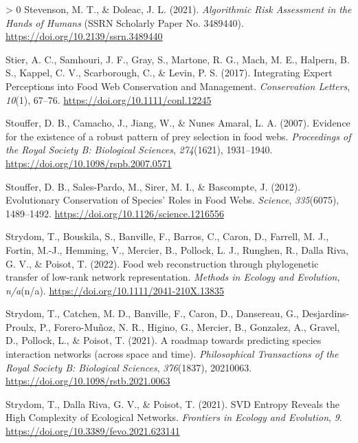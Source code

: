 \documentclass[11pt]{article}
\newlength{\cslhangindent}
\newenvironment{CSLReferences}[3] %
 {%
  \setlength{\parindent}{0pt}
  \ifodd #1 \everypar{\setlength{\hangindent}{\cslhangindent}}\ignorespaces\fi
  \ifnum #2 > 0
  \setlength{\parskip}{#2\baselineskip}
  \fi
 }%
 {}
\begin{document}
\begin{CSLReferences}{1}{0}
\leavevmode\hypertarget{ref-Stevenson2021AlgRis}{}%
Stevenson, M. T., \& Doleac, J. L. (2021). \emph{Algorithmic Risk
Assessment in the Hands of Humans} (SSRN Scholarly Paper No. 3489440).
\url{https://doi.org/10.2139/ssrn.3489440}

\leavevmode\hypertarget{ref-Stier2017IntExp}{}%
Stier, A. C., Samhouri, J. F., Gray, S., Martone, R. G., Mach, M. E.,
Halpern, B. S., Kappel, C. V., Scarborough, C., \& Levin, P. S. (2017).
Integrating Expert Perceptions into Food Web Conservation and
Management. \emph{Conservation Letters}, \emph{10}(1), 67--76.
\url{https://doi.org/10.1111/conl.12245}

\leavevmode\hypertarget{ref-Stouffer2007EviExi}{}%
Stouffer, D. B., Camacho, J., Jiang, W., \& Nunes Amaral, L. A. (2007).
Evidence for the existence of a robust pattern of prey selection in food
webs. \emph{Proceedings of the Royal Society B: Biological Sciences},
\emph{274}(1621), 1931--1940.
\url{https://doi.org/10.1098/rspb.2007.0571}

\leavevmode\hypertarget{ref-Stouffer2012EvoCon}{}%
Stouffer, D. B., Sales-Pardo, M., Sirer, M. I., \& Bascompte, J. (2012).
Evolutionary Conservation of Species' Roles in Food Webs.
\emph{Science}, \emph{335}(6075), 1489--1492.
\url{https://doi.org/10.1126/science.1216556}

\leavevmode\hypertarget{ref-Strydom2022FooWeb}{}%
Strydom, T., Bouskila, S., Banville, F., Barros, C., Caron, D., Farrell,
M. J., Fortin, M.-J., Hemming, V., Mercier, B., Pollock, L. J., Runghen,
R., Dalla Riva, G. V., \& Poisot, T. (2022). Food web reconstruction
through phylogenetic transfer of low-rank network representation.
\emph{Methods in Ecology and Evolution}, \emph{n/a}(n/a).
\url{https://doi.org/10.1111/2041-210X.13835}

\leavevmode\hypertarget{ref-Strydom2021RoaPre}{}%
Strydom, T., Catchen, M. D., Banville, F., Caron, D., Dansereau, G.,
Desjardins-Proulx, P., Forero-Muñoz, N. R., Higino, G., Mercier, B.,
Gonzalez, A., Gravel, D., Pollock, L., \& Poisot, T. (2021). A roadmap
towards predicting species interaction networks (across space and time).
\emph{Philosophical Transactions of the Royal Society B: Biological
Sciences}, \emph{376}(1837), 20210063.
\url{https://doi.org/10.1098/rstb.2021.0063}

\leavevmode\hypertarget{ref-Strydom2021SvdEnt}{}%
Strydom, T., Dalla Riva, G. V., \& Poisot, T. (2021). SVD Entropy
Reveals the High Complexity of Ecological Networks. \emph{Frontiers in
Ecology and Evolution}, \emph{9}.
\url{https://doi.org/10.3389/fevo.2021.623141}


\end{CSLReferences}
\end{document}
